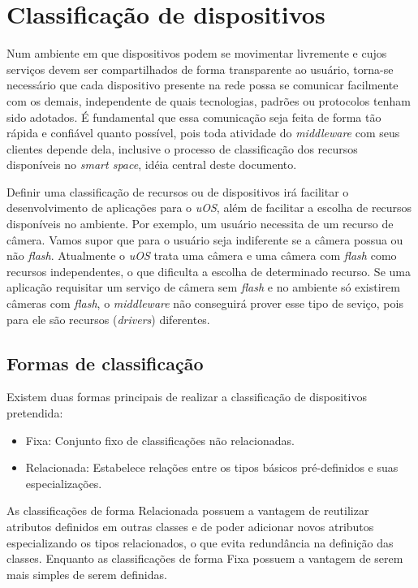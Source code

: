 \section{Classificação de dispositivos}

Num ambiente em que dispositivos podem se movimentar livremente e cujos serviços devem ser compartilhados de forma transparente ao usuário, torna-se necessário que cada dispositivo presente na rede possa se comunicar facilmente com os demais, independente de quais tecnologias, padrões ou protocolos tenham sido adotados. É fundamental que essa comunicação seja feita de forma tão rápida e confiável quanto possível, pois toda atividade do \emph{middleware} com seus clientes depende dela, inclusive o processo de classificação dos recursos disponíveis no \emph{smart space}, idéia central deste documento. 

Definir uma classificação de recursos ou de dispositivos irá facilitar o desenvolvimento de aplicações para o \emph{uOS}, além de facilitar a escolha de recursos disponíveis no ambiente. Por exemplo, um usuário necessita de um recurso de câmera. Vamos supor que para o usuário seja indiferente se a câmera possua ou não \emph{flash}. Atualmente o \emph{uOS} trata uma câmera e uma câmera com \emph{flash} como recursos independentes, o que dificulta a escolha de determinado recurso. Se uma aplicação requisitar um serviço de câmera sem \emph{flash} e no ambiente só existirem câmeras com \emph{flash}, o \emph{middleware} não conseguirá prover esse tipo de seviço, pois para ele são recursos (\emph{drivers}) diferentes.

\subsection{Formas de classificação}

Existem duas formas principais de realizar a classificação de dispositivos pretendida:

\begin{itemize}
	\item Fixa:
		Conjunto fixo de classificações não relacionadas.
	\item Relacionada:
		Estabelece relações entre os tipos básicos pré-definidos e suas especializações.

\end{itemize}

As classificações de forma Relacionada possuem a vantagem de reutilizar atributos definidos em outras classes e de poder adicionar novos atributos especializando os tipos relacionados, o que evita redundância na definição das classes. Enquanto as classificações de forma Fixa possuem a vantagem de serem mais simples de serem definidas.


